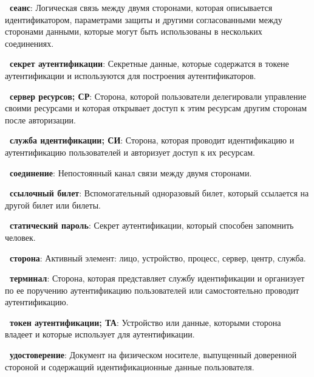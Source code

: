 
{\bf \thedefctr~сеанс}:
Логическая связь между двумя сторонами, которая описывается идентификатором,
параметрами защиты и другими согласованными между сторонами данными, которые
могут быть использованы в нескольких соединениях.

{\bf \thedefctr~секрет аутентификации}:
Секретные данные, которые содержатся в токене аутентификации и используются для
построения аутентификаторов.

{\bf \thedefctr~сервер ресурсов; СР}:
Сторона, которой пользователи делегировали управление своими ресурсами и которая
открывает доступ к этим ресурсам другим сторонам после авторизации.

{\bf \thedefctr~служба идентификации; СИ}:
Сторона, которая проводит идентификацию и аутентификацию пользователей и
авторизует доступ к их ресурсам.
	
{\bf \thedefctr~соединение}:
Непостоянный канал связи между двумя сторонами. 

{\bf \thedefctr~ссылочный билет}:
Вспомогательный одноразовый билет, который ссылается на другой билет или билеты.


{\bf \thedefctr~статический пароль}:
Секрет аутентификации, который способен запомнить человек.

{\bf \thedefctr~сторона}:
Активный элемент: лицо, устройство, процесс, сервер, центр, служба.

{\bf \thedefctr~терминал}:
Сторона, которая представляет службу идентификации и организует по ее поручению
аутентификацию пользователей или самостоятельно проводит аутентификацию.

{\bf \thedefctr~токен аутентификации; ТА}:
Устройство или данные, которыми сторона владеет и которые использует для
аутентификации.

{\bf \thedefctr~удостоверение}:
Документ на физическом носителе, выпущенный доверенной стороной и содержащий
идентификационные данные пользователя.


